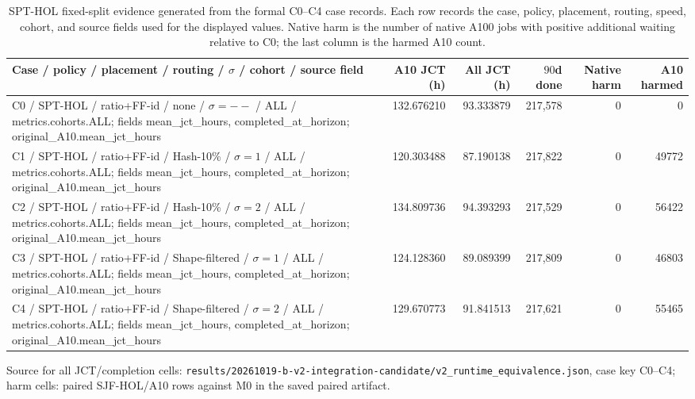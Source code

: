 \begin{table}[H]\centering
\caption{SPT-HOL fixed-split evidence generated from the formal C0--C4 case records. Each row records the case, policy, placement, routing, speed, cohort, and source fields used for the displayed values. Native harm is the number of native A100 jobs with positive additional waiting relative to C0; the last column is the harmed A10 count.}
\label{tab:r2q3main}
\begin{tabularx}{\linewidth}{>{\raggedright\arraybackslash}Xrrrrr}
\toprule
Case / policy / placement / routing / $\sigma$ / cohort / source field & A10 JCT (h) & All JCT (h) & $90$d done & Native harm & A10 harmed\\
\midrule
C0 / SPT-HOL / ratio+FF-id / none / $\sigma=--$ / ALL / metrics.cohorts.ALL; fields mean\_jct\_hours, completed\_at\_horizon; original\_A10.mean\_jct\_hours & 132.676210 & 93.333879 & 217,578 & 0 & 0\\
C1 / SPT-HOL / ratio+FF-id / Hash-10\% / $\sigma=1$ / ALL / metrics.cohorts.ALL; fields mean\_jct\_hours, completed\_at\_horizon; original\_A10.mean\_jct\_hours & 120.303488 & 87.190138 & 217,822 & 0 & 49772\\
C2 / SPT-HOL / ratio+FF-id / Hash-10\% / $\sigma=2$ / ALL / metrics.cohorts.ALL; fields mean\_jct\_hours, completed\_at\_horizon; original\_A10.mean\_jct\_hours & 134.809736 & 94.393293 & 217,529 & 0 & 56422\\
C3 / SPT-HOL / ratio+FF-id / Shape-filtered / $\sigma=1$ / ALL / metrics.cohorts.ALL; fields mean\_jct\_hours, completed\_at\_horizon; original\_A10.mean\_jct\_hours & 124.128360 & 89.089399 & 217,809 & 0 & 46803\\
C4 / SPT-HOL / ratio+FF-id / Shape-filtered / $\sigma=2$ / ALL / metrics.cohorts.ALL; fields mean\_jct\_hours, completed\_at\_horizon; original\_A10.mean\_jct\_hours & 129.670773 & 91.841513 & 217,621 & 0 & 55465\\
\bottomrule
\end{tabularx}
\smallskip\noindent Source for all JCT/completion cells: \texttt{results/20261019-b-v2-integration-candidate/v2\_runtime\_equivalence.json}, case key C0--C4; harm cells: paired SJF-HOL/A10 rows against M0 in the saved paired artifact.
\end{table}
